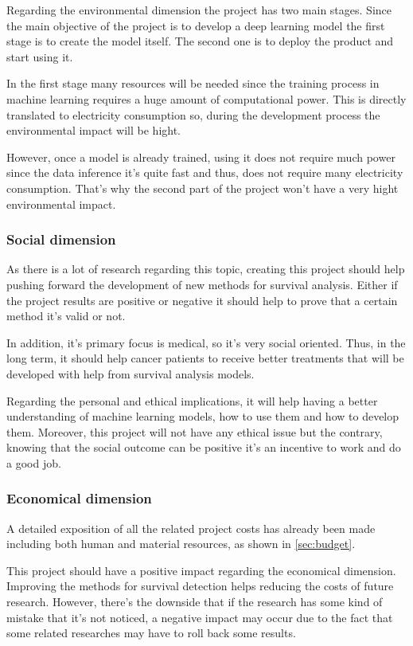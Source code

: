 Regarding the environmental dimension the project has two main stages. Since the main objective
of the project is to develop a deep learning model the first stage is to create the model
itself. The second one is to deploy the product and start using it.

In the first stage many resources will be needed since the training process in machine learning
requires a huge amount of computational power. This is directly translated to electricity 
consumption so, during the development process the environmental impact will be hight.

However, once a model is already trained, using it does not require much power since the
data inference it's quite fast and thus, does not require many electricity consumption.
That's why the second part of the project won't have a very hight environmental impact.

\subsubsection{Social dimension}

As there is a lot of research regarding this topic, creating this project should help pushing 
forward the development of new methods for survival analysis. Either if the project results 
are positive or negative it should help to prove that a certain method it's valid or not. 

In addition, it's primary focus is medical, so it's very social oriented. Thus,
in the long term, it should help cancer patients to receive better treatments 
that will be developed with help from survival analysis models. 

Regarding the personal and ethical implications, it will help having a better understanding
of machine learning models, how to use them and how to develop them. Moreover, this project
will not have any ethical issue but the contrary, knowing that the social outcome can be
positive it's an incentive to work and do a good job.

\subsubsection{Economical dimension}

A detailed exposition of all the related project costs has already been made including both
human and material resources, as shown in \autoref{sec:budget}.

This project should have a positive impact regarding the economical dimension. Improving
the methods for survival detection helps reducing the costs of future research. However, 
there's the downside that if the research has some kind of mistake that it's not noticed,
a negative impact may occur due to the fact that some related researches may have to roll
back some results.
